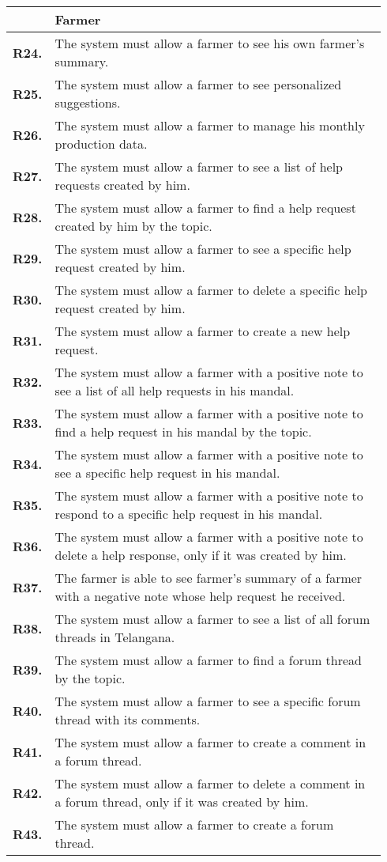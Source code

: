 \begin{longtable}{@{}p{0.06\linewidth} p{0.88\linewidth}}
    & \textbf{Farmer}\\
    \midrule
	\textbf{R24.} & The system must allow a farmer to see his own farmer's summary.\\
	\textbf{R25.} & The system must allow a farmer to see personalized suggestions.\\
	\textbf{R26.} & The system must allow a farmer to manage his monthly production data.\\
	\textbf{R27.} & The system must allow a farmer to see a list of help requests created by him.\\
	\textbf{R28.} & The system must allow a farmer to find a help request created by him by the topic.\\
	\textbf{R29.} & The system must allow a farmer to see a specific help request created by him.\\
	\textbf{R30.} & The system must allow a farmer to delete a specific help request created by him.\\
	\textbf{R31.} & The system must allow a farmer to create a new help request.\\
	\textbf{R32.} & The system must allow a farmer with a positive note to see a list of all help requests in his mandal.\\
	\textbf{R33.} & The system must allow a farmer with a positive note to find a help request in his mandal by the topic.\\
	\textbf{R34.} & The system must allow a farmer with a positive note to see a specific help request in his mandal.\\
	\textbf{R35.} & The system must allow a farmer with a positive note to respond to a specific help request in his mandal.\\
	\textbf{R36.} & The system must allow a farmer with a positive note to delete a help response, only if it was created by him.\\
	\textbf{R37.} & The farmer is able to see farmer's summary of a farmer with a negative note whose help request he received. \\
	\textbf{R38.} & The system must allow a farmer to see a list of all forum threads in Telangana.\\
	\textbf{R39.} & The system must allow a farmer to find a forum thread by the topic.\\
	\textbf{R40.} & The system must allow a farmer to see a specific forum thread with its comments.\\
	\textbf{R41.} & The system must allow a farmer to create a comment in a forum thread.\\
	\textbf{R42.} & The system must allow a farmer to delete a comment in a forum thread, only if it was created by him.\\
	\textbf{R43.} & The system must allow a farmer to create a forum thread.\\
	\midrule


\end{longtable}
